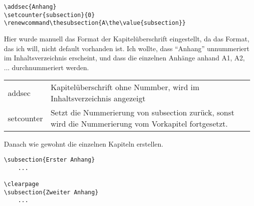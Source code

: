 \begin{verbatim}
\addsec{Anhang}
\setcounter{subsection}{0}
\renewcommand\thesubsection{A\the\value{subsection}}
\end{verbatim}

Hier wurde manuell das Format der Kapitelüberschrift eingestellt,
da das Format, das ich will, nicht default vorhanden ist.
Ich wollte, dass ``Anhang'' unnummeriert im Inhaltsverzeichnis erscheint,
und dass die einzelnen Anhänge anhand A1, A2, ... durchnummeriert werden.

\begin{center}
\begin{tabu} to 
	\toprule
	addsec	& Kapitelüberschrift ohne Nummber, wird im Inhaltsverzeichnis angezeigt\\
	setcounter	& Setzt die Nummerierung von subsection zurück,
		sonst wird die Nummerierung vom Vorkapitel fortgesetzt.\\
	\bottomrule
\end{tabu}
\end{center}

Danach wie gewohnt die einzelnen Kapiteln erstellen.

\begin{verbatim}
\subsection{Erster Anhang}
    ...
    
\clearpage
\subsection{Zweiter Anhang}
    ...
\end{verbatim}